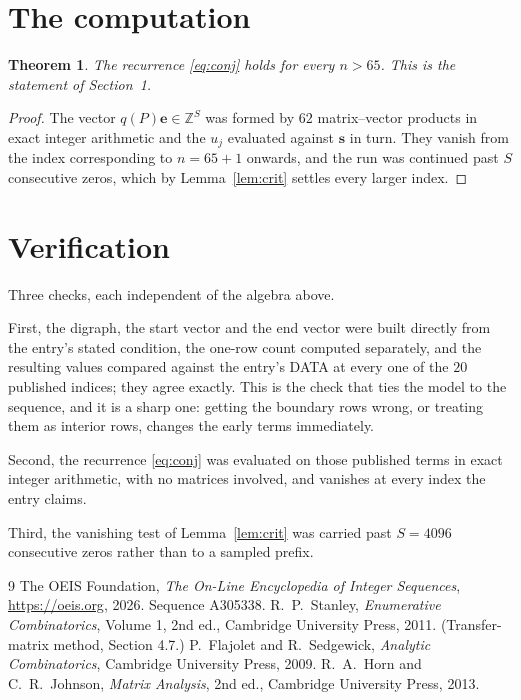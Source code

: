 \documentclass[11pt,a4paper]{article}
\theoremstyle{plain}
\newtheorem{theorem}{Theorem}
\theoremstyle{definition}
\begin{document}
\section{The computation}

\begin{theorem}
The recurrence \eqref{eq:conj} holds for every $n>65$. This is the statement of
Section~1.
\end{theorem}

\begin{proof}
The vector $q(P)\mathbf{e}\in\mathbb{Z}^{S}$ was formed by $62$ matrix--vector
products in exact integer arithmetic and the $u_j$ evaluated against $\mathbf{s}$ in turn.
They vanish from the index corresponding to $n=65+1$ onwards, and the run was continued
past $S$ consecutive zeros, which by Lemma~\ref{lem:crit} settles every larger index.
\end{proof}

\section{Verification}

Three checks, each independent of the algebra above.

First, the digraph, the start vector and the end vector were built directly from the
entry's stated condition, the one-row count computed separately, and the resulting values
compared against the entry's DATA at every one of the $20$ published indices; they
agree exactly. This is the check that ties the model to the sequence, and it is a sharp one:
getting the boundary rows wrong, or treating them as interior rows, changes the early terms
immediately.

Second, the recurrence \eqref{eq:conj} was evaluated on those published terms in exact
integer arithmetic, with no matrices involved, and vanishes at every index the entry claims.

Third, the vanishing test of Lemma~\ref{lem:crit} was carried past $S=4096$ consecutive
zeros rather than to a sampled prefix.

\begin{thebibliography}{9}
 The OEIS Foundation, \emph{The On-Line Encyclopedia of Integer
Sequences}, \url{https://oeis.org}, 2026. Sequence A305338.
 R.~P.~Stanley, \emph{Enumerative Combinatorics}, Volume 1, 2nd ed.,
Cambridge University Press, 2011. (Transfer-matrix method, Section 4.7.)
 P.~Flajolet and R.~Sedgewick, \emph{Analytic Combinatorics}, Cambridge
University Press, 2009.
 R.~A.~Horn and C.~R.~Johnson, \emph{Matrix Analysis}, 2nd ed., Cambridge
University Press, 2013.
\end{thebibliography}
\end{document}
